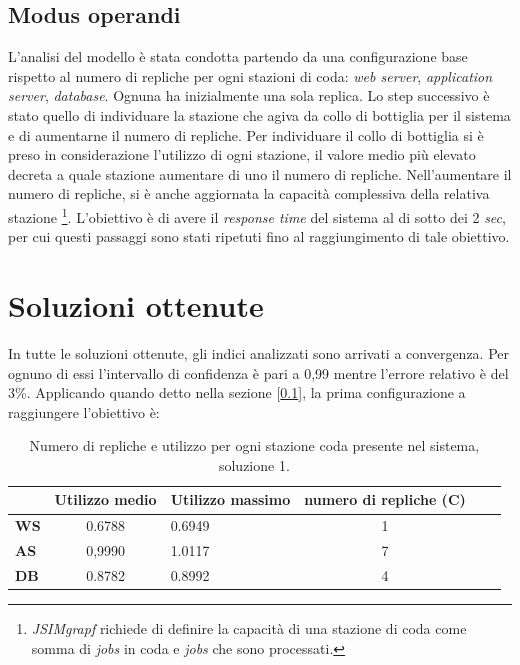 \documentclass[../main.tex]{subfiles}
\begin{document}
    \subsection{Modus operandi}\label{subsec:modus-operandi}
    L'analisi del modello è stata condotta partendo da una configurazione base rispetto al numero di repliche per ogni
    stazioni di coda: \textit{web server}, \textit{application server}, \textit{database}. Ognuna ha inizialmente una
    sola replica.
    Lo step successivo è stato quello di individuare la stazione che agiva da collo di bottiglia per il sistema e di
    aumentarne il numero di repliche.
    Per individuare il collo di bottiglia si è preso in considerazione l'utilizzo di ogni stazione, il valore medio più
    elevato decreta a quale stazione aumentare di uno il numero di repliche.
    Nell'aumentare il numero di repliche, si è anche aggiornata la capacità complessiva della relativa stazione
    \footnote{\textit{JSIMgrapf} richiede di definire la capacità di una stazione di coda come somma di \textit{jobs} in
    coda e \textit{jobs} che sono processati.}.
    L'obiettivo è di avere il \textit{response time} del sistema al di sotto dei 2 \textit{sec}, per cui questi passaggi
    sono stati ripetuti fino al raggiungimento di tale obiettivo.


    \section{Soluzioni ottenute}\label{sec:soluzioni-ottenute}
    In tutte le soluzioni ottenute, gli indici analizzati sono arrivati a convergenza. Per ognuno di essi l'intervallo
    di confidenza è pari a 0,99 mentre l'errore relativo è del 3\%.
    \newline
    Applicando quando detto nella sezione [\ref{subsec:modus-operandi}], la prima configurazione a raggiungere
    l'obiettivo è:
    \begin{table}[h]
        \centering
        \begin{tabular}{|l|c|l|c|l|c}
            \hline
            & \textbf{Utilizzo medio} & \textbf{Utilizzo massimo} & \textbf{numero di repliche (C)}  \\ [0.5ex]
            \hline
            \textbf{WS} & 0.6788                  & 0.6949                    & 1                               \\
            \textbf{AS} & 0,9990                  & 1.0117                    & 7                               \\
            \textbf{DB} & 0.8782                  & 0.8992                    & 4                               \\
            \hline
        \end{tabular}
        \caption{Numero di repliche e utilizzo per ogni stazione coda presente nel sistema, soluzione 1.}
        \label{tab:valori-soluzione-1-del-problema}
    \end{table}
\end{document}
